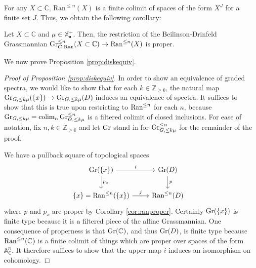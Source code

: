 For any $X\subset \mathbb{C}$, $\mathrm{Ran}^{\leq n}(X)$ is a finite colimit of spaces of the form $X^J$ for a finite set $J$.  Thus, we obtain the following corollary:

\begin{cor}\label{cor:ranproper}
Let $X\subset \mathbb{C}$ and $\mu \in \mathbb{X}_{\bullet}^+$.  Then, the restriction of the Beilinson-Drinfeld Grassmannian $\operatorname{\mathrm{Gr}}^{\leq n}_{G,\operatorname{\mathrm{Ran}}}(X\subset \mathbb{C}) \to \mathrm{Ran}^{\leq n}(X)$ is proper.
\end{cor}

We now prove Proposition \ref{prop:diskequiv}.  

\begin{proof}[Proof of Proposition \ref{prop:diskequiv}]
In order to show an equivalence of graded spectra, we would like to show that for each $k\in \mathbb{Z}_{\geq 0}$, the natural map $\operatorname{\mathrm{Gr}}_{G,\leq k \mu}(\{ x\}) \to \operatorname{\mathrm{Gr}}_{G,\leq k\mu}(D)$ induces an equivalence of spectra.  It suffices to show that this is true upon restricting to $\operatorname{\mathrm{Ran}}^{\leq n}$ for each $n$, because $\operatorname{\mathrm{Gr}}_{G, \leq k \mu} = \operatorname*{\mathrm{colim}}_n \operatorname{\mathrm{Gr}}^{\leq n}_{G,\leq k\mu}$ is a filtered colimit of closed inclusions.  For ease of notation, fix $n,k\in \mathbb{Z}_{\geq 0}$ and let $\operatorname{\mathrm{Gr}}$ stand in for $\operatorname{\mathrm{Gr}}^{\leq n}_{G,\leq k \mu}$ for the remainder of the proof.  

We have a pullback square of topological spaces 
\begin{equation*}
\begin{tikzcd}
\Gra (\{ x\}) \arrow[r,"i"]\arrow[d,"p_x"] & \Gra (D) \arrow[d,"p"]\\
\{x \} = \Ran^{\leq n}(\{ x\} )\arrow[r,"j"] & \Ran^{\leq n}(D)
\end{tikzcd} \end{equation*}
where $p$ and $p_x$ are proper by Corollary \ref{cor:ranproper}.  Certainly $\operatorname{\mathrm{Gr}}(\{ x\})$ is finite type because it is a filtered piece of the affine Grassmannian.  One consequence of properness is that $\operatorname{\mathrm{Gr}}(\mathbb{C})$, and thus $\operatorname{\mathrm{Gr}}(D)$, is finite type because $\operatorname{\mathrm{Ran}}^{\leq n}(\mathbb{C})$ is a finite colimit of things which are proper over spaces of the form $\mathbb{A}^n_{\mathbb{C}}$.  It therefore suffices to show that the upper map $i$ induces an isomorphism on cohomology.  


\end{proof}
